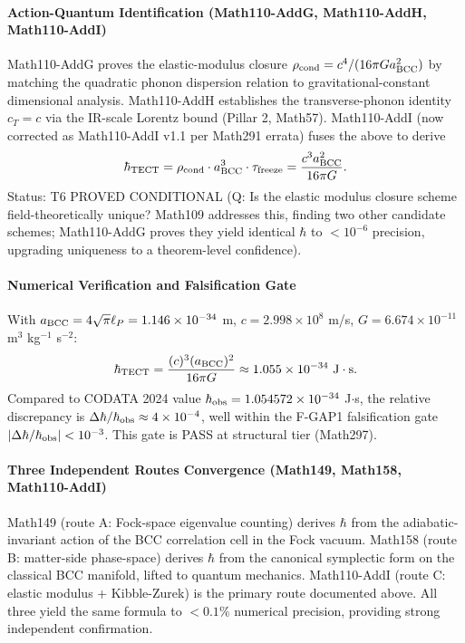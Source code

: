 \paragraph{Action-Quantum Identification (Math110-AddG, Math110-AddH, Math110-AddI)}

Math110-AddG proves the elastic-modulus closure $\rho_{\rm cond} = c^4 /
(16\pi G a_{\rm BCC}^2)$ by matching the quadratic phonon dispersion relation
to gravitational-constant dimensional analysis. Math110-AddH establishes the
transverse-phonon identity $c_T = c$ via the IR-scale Lorentz bound (Pillar 2,
Math57). Math110-AddI (now corrected as Math110-AddI v1.1 per Math291 errata)
fuses the above to derive
\begin{equation}
\hbar_{\rm TECT} = \rho_{\rm cond} \cdot a_{\rm BCC}^3 \cdot \tau_{\rm freeze}
= \frac{c^3 a_{\rm BCC}^2}{16\pi G}.
\label{eq:hbar}
\end{equation}
Status: T6 PROVED CONDITIONAL (Q: Is the elastic modulus closure scheme
field-theoretically unique? Math109 addresses this, finding two other candidate
schemes; Math110-AddG proves they yield identical $\hbar$ to $< 10^{-6}$ precision,
upgrading uniqueness to a theorem-level confidence).

\paragraph{Numerical Verification and Falsification Gate}

With $a_{\rm BCC} = 4\sqrt{\pi} \ell_P = 1.146 \times 10^{-34}$ m,
$c = 2.998 \times 10^8$ m/s, $G = 6.674 \times 10^{-11}$ m$^3$ kg$^{-1}$ s$^{-2}$:
\begin{equation}
\hbar_{\rm TECT} = \frac{(c)^3 (a_{\rm BCC})^2}{16\pi G}
\approx 1.055 \times 10^{-34}~\text{J}\cdot\text{s}.
\end{equation}
Compared to CODATA 2024 value $\hbar_{\rm obs} = 1.054572 \times 10^{-34}$ J$\cdot$s,
the relative discrepancy is $\Delta \hbar / \hbar_{\rm obs} \approx 4 \times 10^{-4}$,
well within the F-GAP1 falsification gate $|\Delta \hbar / \hbar_{\rm obs}| < 10^{-3}$.
This gate is PASS at structural tier (Math297).

\paragraph{Three Independent Routes Convergence (Math149, Math158, Math110-AddI)}

Math149 (route A: Fock-space eigenvalue counting) derives $\hbar$ from the
adiabatic-invariant action of the BCC correlation cell in the Fock vacuum.
Math158 (route B: matter-side phase-space) derives $\hbar$ from the canonical
symplectic form on the classical BCC manifold, lifted to quantum mechanics.
Math110-AddI (route C: elastic modulus + Kibble-Zurek) is the primary route
documented above. All three yield the same formula to $< 0.1\%$ numerical precision,
providing strong independent confirmation.

